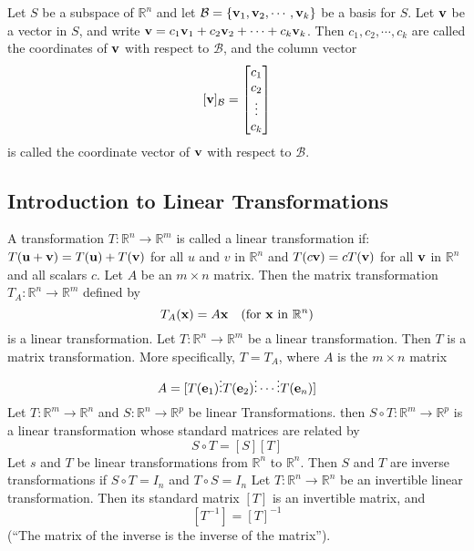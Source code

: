 \documentclass{article}
\begin{document}
\begin{outline}
            \1 Let $S$ be a subspace of \(\mathbb R^n\) and let \(\mathcal B=\{\vb v_1,\vb v_2,\cdots,\vb v_k\}\) be a basis for $S$. Let \(\vb v\) be a vector in $S$, and write \(\vb v=c_1\vb v_1+c_2\vb v_2+\cdots+c_k\vb v_k\). Then \(c_1,c_2,\cdots,c_k\) are called the coordinates of \(\vb v\) with respect to \(\mathcal B\), and the column vector \[[\vb v]_\mathcal B=\begin{bmatrix}
                c_1\\c_2\\\vdots\\c_k
            \end{bmatrix}\] is called the coordinate vector of \(\vb v\) with respect to \(\mathcal B\). 
       \end{outline}
       \subsection{Introduction to Linear Transformations}
       \begin{outline}
            \1 A transformation \(T:\mathbb R^n\to \mathbb R^m\) is called a linear transformation if:
                \2 \(T(\vb u+\vb v)=T(\vb u)+T(\vb v)\) for all \(u\) and \(v\) in \(\mathbb R^n\) and 
                \2 \(T(c\vb v)=cT(\vb v)\) for all \(\vb v\) in \(\mathbb R^n\) and all scalars $c$. 
            \1 Let \(A\) be an \(m\times n\) matrix. Then the matrix transformation \(T_A:\mathbb R^n\to\mathbb R^m\) defined by \[T_A(\vb x)=A\vb x\quad (\text{for }\vb x\text{ in }\mathbb R^n)\] is a linear transformation. 
            \1 Let \(T:\mathbb R^n\to \mathbb R^m\) be a linear transformation. Then \(T\) is a matrix transformation. More specifically, \(T=T_A\), where \(A\) is the \(m\times n\) matrix \[A=[T(\vb e_1)\vdots T(\vb e_2)\vdots\cdots\vdots T(\vb e_n)]\]
            \1 Let \(T:\mathbb R^m\to \mathbb R^n\) and \(S:\mathbb R^n\to\mathbb R^p\) be linear Transformations. then \(S\circ T:\mathbb R^m\to\mathbb R^p\) is a linear transformation whose standard matrices are related by \[S\circ T=[S][T]\]
            \1 Let $s$ and $T$ be linear transformations from \(\mathbb R^n\) to \(\mathbb R^n\). Then $S$ and $T$ are inverse transformations if \(S\circ T=I_n\) and \(T\circ S=I_n\)
            \1 Let \(T:\mathbb R^n\to\mathbb R^n\) be an invertible linear transformation. Then its standard matrix \([T]\) is an invertible matrix, and \[[T^{-1}]=[T]^{-1}\] (``The matrix of the inverse is the inverse of the matrix''). 

       \end{outline}
\end{document}
